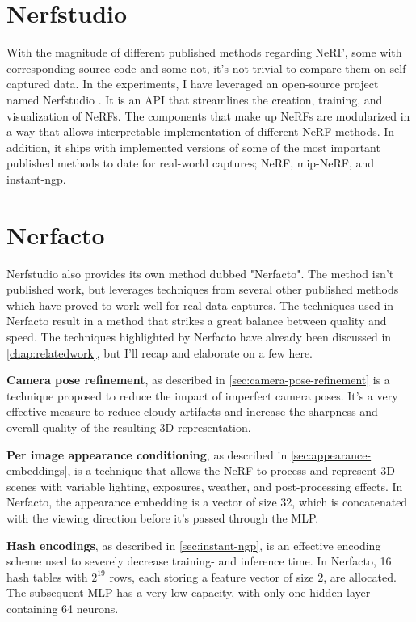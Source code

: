 \section{Nerfstudio}
With the magnitude of different published methods regarding NeRF, some with corresponding source code and some not, it's not trivial to compare them on self-captured data. In the experiments, I have leveraged an open-source project named Nerfstudio \cite{nerfstudio}. It is an API that streamlines the creation, training, and visualization of NeRFs. The components that make up NeRFs are modularized in a way that allows interpretable implementation of different NeRF methods. In addition, it ships with implemented versions of some of the most important published methods to date for real-world captures; NeRF, mip-NeRF, and instant-ngp.

\section{Nerfacto}
Nerfstudio also provides its own method dubbed "Nerfacto". The method isn't published work, but leverages techniques from several other published methods which have proved to work well for real data captures. The techniques used in Nerfacto result in a method that strikes a great balance between quality and speed. The techniques highlighted by Nerfacto have already been discussed in \autoref{chap:relatedwork}, but I'll recap and elaborate on a few here.



\textbf{Camera pose refinement}, as described in \autoref{sec:camera-pose-refinement} is a technique proposed to reduce the impact of imperfect camera poses. It's a very effective measure to reduce cloudy artifacts and increase the sharpness and overall quality of the resulting 3D representation.

\textbf{Per image appearance conditioning}, as described in \autoref{sec:appearance-embeddings}, is a technique that allows the NeRF to process and represent 3D scenes with variable lighting, exposures, weather, and post-processing effects. In Nerfacto, the appearance embedding is a vector of size 32, which is concatenated with the viewing direction before it's passed through the MLP.

\textbf{Hash encodings}, as described in \autoref{sec:instant-ngp}, is an effective encoding scheme used to severely decrease training- and inference time. In Nerfacto, 16 hash tables with $2^{19}$ rows, each storing a feature vector of size 2, are allocated. The subsequent MLP has a very low capacity, with only one hidden layer containing 64 neurons.

